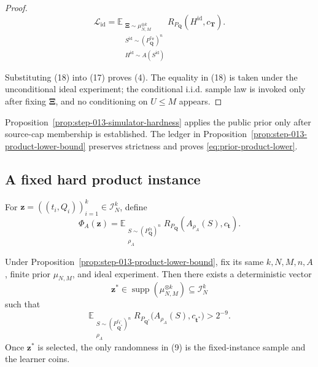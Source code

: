 \begin{proof}
\[
\mathcal L_{\mathrm{id}}
=
\mathbb E_{\substack{\boldsymbol\Xi\sim\mu_{N,M}^{\otimes k}\\
                      S^{\mathrm{id}}\sim
                      (P_{\boldsymbol Q}^{c_{\boldsymbol T}})^n\\
                      H^{\mathrm{id}}\sim A(S^{\mathrm{id}})}}
R_{P_{\boldsymbol Q}}(H^{\mathrm{id}},c_{\boldsymbol T}).
\tag{18}
\]

Substituting (18) into (17) proves (4). The equality in (18) is taken under
the unconditional ideal experiment; the conditional i.i.d. sample law is
invoked only after fixing \(\boldsymbol\Xi\), and no conditioning on
\(U\le M\) appears. \end{proof}
Proposition~\ref{prop:step-013-simulator-hardness} applies the public prior
only after source-cap membership is established.  The ledger in
Proposition~\ref{prop:step-013-product-lower-bound} preserves strictness and
proves \eqref{eq:prior-product-lower}.

\subsection{A fixed hard product instance}\label{app:step-014}
For $\boldsymbol z=((t_i,Q_i))_{i=1}^k\in\mathcal I_N^k$, define
\begin{equation}
\Phi_A(\boldsymbol z)
=\mathbb E_{\substack{S\sim(P_{\boldsymbol Q}^{c_{\boldsymbol t}})^n\\
\rho_A}}
R_{P_{\boldsymbol Q}}(A_{\rho_A}(S),c_{\boldsymbol t}).
\tag{3}\label{eq:fixed-instance-functional}
\end{equation}
\begin{proposition}\label{prop:step-014-fixed-extraction}
Under Proposition~\ref{prop:step-013-product-lower-bound}, fix its
same \(k,N,M,n,A\), finite prior \(\mu_{N,M}\), and ideal experiment. Then
there exists a deterministic vector
\[
\boldsymbol z^*\in\operatorname{supp}(\mu_{N,M}^{\otimes k})
\subseteq\mathcal I_N^k
\tag{8}
\]
such that
\[
\mathbb E_{\substack{S\sim(P_{\boldsymbol Q^*}^{c_{\boldsymbol t^*}})^n\\
\rho_A}}
R_{P_{\boldsymbol Q^*}}\bigl(A_{\rho_A}(S),c_{\boldsymbol t^*}\bigr)
>2^{-9}.
\tag{9}
\]
Once \(\boldsymbol z^*\) is selected, the only randomness in (9) is the
fixed-instance sample and the learner coins.
\end{proposition}

